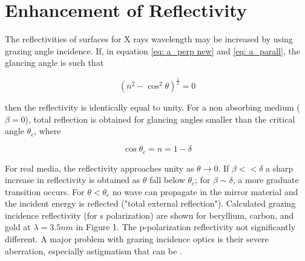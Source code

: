 \section{Enhancement of Reflectivity}

\hspace{10mm} The reflectivities of surfaces for X rays wavelength may be increased by using grazing angle incidence. If, in equation \ref{eq: a_perp new} and \ref{eq: a_parall}, the glancing angle is such that

\begin{equation}
	(\overline{n}^2 - \cos^2 \theta)^{\frac{1}{2}} = 0
	\label{eq: enhancement of R}
\end{equation}

\begin{flushleft}
then the reflectivity is identically equal to unity. For a non absorbing medium ($\beta = 0 $), total reflection is obtained for glancing angles smaller than the critical angle $\theta_c $, where
\end{flushleft}

\begin{equation}
	\cos \theta_c = n = 1 - \delta
	\label{eq: cos thetac} 
\end{equation}

\begin{flushleft}
For real media, the reflectivity  approaches unity as $\theta \rightarrow 0 $. If $\beta << \delta $ a sharp increase in reflectivity is obtained as $\theta $ fall below $\theta_c $; for $\beta \sim \delta $, a more graduate transition occurs. For $\theta < \theta_c $ no wave can propagate in the mirror material and the incident energy is reflected ("total external reflection"). Calculated grazing incidence reflectivity (for s polarization) are shown for beryllium, carbon, and gold at $\lambda = 3.5 nm$ in Figure 1. The p-polarization reflectivity not significantly different. A major problem with grazing incidence optics is their severe aberration, especially astigmatism that can be .
\end{flushleft}